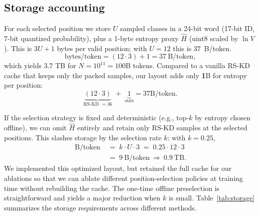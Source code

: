 \documentclass[11pt]{article}
\begin{document}
\subsection{Storage accounting}
For each selected position we store $U$ sampled classes in a 24-bit word (17-bit ID, 7-bit quantized probability), plus a 1-byte entropy proxy $\hat H$ (uint8 scaled by $\ln V$).
This is $3U+1$ bytes per valid position; with $U{=}12$ this is $37$~B/token.
\[
	\text{bytes/token} = (12 \cdot 3) + 1 = 37\ \text{B/token},
\]
which yields $3.7$ TB for $N{=}10^{11}{=}100$B tokens. Compared to a vanilla RS-KD cache that keeps only the packed samples, our layout adds only \textbf{1}B for entropy per position:
\[
	\underbrace{(12 \cdot 3)}_{\text{RS-KD }=36} \;+\; \underbrace{1}_{\text{ours}}
	= 37\text{B/token}.
\]

If the selection strategy is fixed and deterministic (e.g., top-$k$ by entropy chosen offline), we can omit $\hat H$ entirely and retain only RS-KD samples at the selected positions. This slashes storage by the selection rate $k$: with $k{=}0.25$,
\begin{align*}
	\text{B}/\text{token} \; & =\; k \cdot U \cdot 3
	\;=\; 0.25 \cdot 12 \cdot 3                                                               \\
	\;                       & =\; 9~\text{B}/\text{token} \ \Longrightarrow\ 0.9~\text{TB}.
\end{align*}
We implemented this optimized layout, but retained the full cache for our ablations so that we can ablate different position-selection policies at training time without rebuilding the cache. The one-time offline preselection is straightforward and yields a major reduction when $k$ is small.
Table~\ref{tab:storage} summarizes the storage requirements across different methods.
\end{document}
